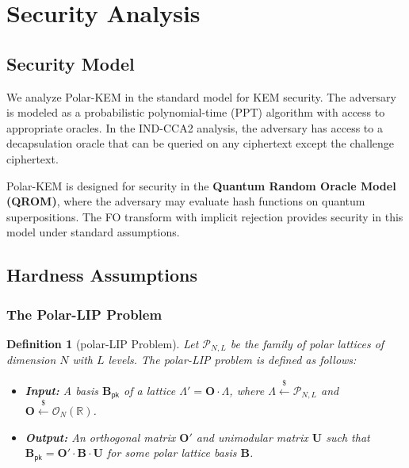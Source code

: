 \documentclass[11pt,a4paper]{article}
\newtheorem{definition}[theorem]{Definition}
\newcommand{\polarKem}{\textsf{Polar-KEM}\xspace}
\newcommand{\FO}{\textsf{FO}\xspace}
\newcommand{\polarLIP}{\textsf{polar-LIP}\xspace}
\newcommand{\INDCCA}{\textsf{IND-CCA2}\xspace}
\newcommand{\QROM}{\textsf{QROM}\xspace}
\newcommand{\R}{\mathbb{R}}
\newcommand{\sample}{\xleftarrow{\$}}
\newcommand{\pk}{\mathsf{pk}}
\begin{document}
\section{Security Analysis}\label{sec:security}

\subsection{Security Model}\label{sec:security-model}

We analyze \polarKem in the standard model for KEM security. The adversary is modeled as a probabilistic polynomial-time (PPT) algorithm with access to appropriate oracles. In the \INDCCA analysis, the adversary has access to a decapsulation oracle that can be queried on any ciphertext except the challenge ciphertext.

\polarKem is designed for security in the \textbf{Quantum Random Oracle Model (\QROM)}, where the adversary may evaluate hash functions on quantum superpositions. The \FO transform with implicit rejection provides security in this model under standard assumptions.

\subsection{Hardness Assumptions}\label{sec:assumptions}

\subsubsection{The Polar-LIP Problem}

\begin{definition}[\polarLIP Problem]\label{def:polar-lip-problem}
Let $\mathcal{P}_{N,L}$ be the family of polar lattices of dimension $N$ with $L$ levels. The \emph{\polarLIP} problem is defined as follows:

\begin{itemize}[leftmargin=2em]
\item \textbf{Input:} A basis $\mathbf{B}_{\pk}$ of a lattice $\Lambda' = \mathbf{O} \cdot \Lambda$, where $\Lambda \sample \mathcal{P}_{N,L}$ and $\mathbf{O} \sample \mathcal{O}_N(\R)$.
\item \textbf{Output:} An orthogonal matrix $\mathbf{O}'$ and unimodular matrix $\mathbf{U}$ such that $\mathbf{B}_{\pk} = \mathbf{O}' \cdot \mathbf{B} \cdot \mathbf{U}$ for some polar lattice basis $\mathbf{B}$.
\end{itemize}
\end{definition}
\end{document}
